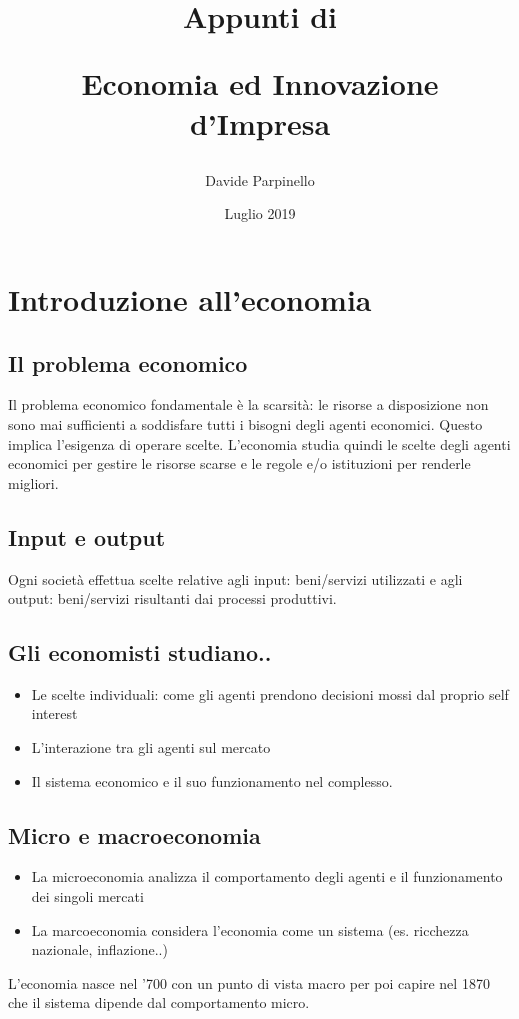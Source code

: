 \documentclass{report}
\begin{document}
	
	\author{Davide Parpinello}
	\title{%
			\begin{Large}
				Appunti di\\
			\end{Large}
		Economia ed Innovazione d'Impresa}
	\date{Luglio 2019}
	\maketitle
	
	\tableofcontents
	\renewcommand{\chaptermark}[1]{%
		\markboth{#1}{}}
	\pagestyle{fancy}
	\fancyhf{}
	\lhead{\leftmark}
	\rfoot{\thepage}
	
	\chapter{Introduzione all'economia}
	\section{Il problema economico}
	Il problema economico fondamentale è la scarsità: le risorse a disposizione non sono mai sufficienti a soddisfare tutti i bisogni degli agenti economici.
	Questo implica l'esigenza di operare scelte. L'economia studia quindi le scelte degli agenti economici per gestire le risorse scarse e le regole e/o istituzioni per renderle migliori.
	\section{Input e output}
	Ogni società effettua scelte relative agli input: beni/servizi utilizzati e agli output: beni/servizi risultanti dai processi produttivi.
	\section{Gli economisti studiano..}
	\begin{itemize}
		\item Le scelte individuali: come gli agenti prendono decisioni mossi dal proprio self interest
		\item L'interazione tra gli agenti sul mercato
		\item Il sistema economico e il suo funzionamento nel complesso.
	\end {itemize}
	\section{Micro e macroeconomia}
	\begin{itemize}
		\item La microeconomia analizza il comportamento degli agenti e il funzionamento dei singoli mercati
		\item La marcoeconomia considera l'economia come un sistema (es. ricchezza nazionale, inflazione..)
	\end {itemize}
	L'economia nasce nel '700 con un punto di vista macro per poi capire nel 1870 che il sistema dipende dal comportamento micro.
\end{document}
